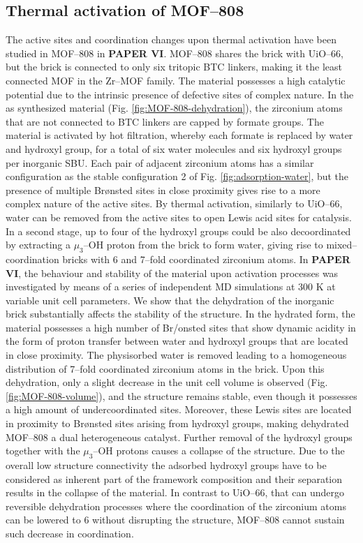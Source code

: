 \subsection{Thermal activation of MOF--808}
The active sites and coordination changes upon thermal activation have been studied in MOF--808 in \textbf{PAPER VI}. MOF--808 shares the  brick with UiO--66, but the brick is connected to only six tritopic BTC linkers, making it the least connected MOF in the Zr--MOF family. The material possesses a high catalytic potential due to the intrinsic presence of defective sites of complex nature.  In the as synthesized material (Fig. \ref{fig:MOF-808-dehydration}), the zirconium atoms that are not connected to BTC linkers are capped by formate groups. The material is activated by hot filtration, whereby each formate is replaced by water and hydroxyl group, for a total of six water molecules and six hydroxyl groups per inorganic SBU. Each pair of adjacent zirconium atoms has a similar configuration as the stable configuration 2 of Fig. \ref{fig:adsorption-water}, but the presence of multiple Br\o{}nsted sites in close proximity gives rise to a more complex nature of the active sites. By thermal activation, similarly to UiO--66, water can be removed from the active sites to open Lewis acid sites for catalysis. In a second stage, up to four of the hydroxyl groups could be also decoordinated by extracting a $\mu_3$--OH proton from the brick to form water, giving rise to mixed--coordination bricks with 6 and 7--fold coordinated zirconium atoms.
\npar
In \textbf{PAPER VI}, the behaviour and stability of the material upon activation processes was investigated by means of a series of independent MD simulations at 300 K at variable unit cell parameters. We show that the dehydration of the inorganic brick substantially affects the stability of the structure. In the hydrated form, the material possesses a high number of Br/o{}nsted sites that show dynamic acidity in the form of proton transfer between water and hydroxyl groups that are located in close proximity. The physisorbed water is removed leading to a homogeneous distribution of 7--fold coordinated zirconium atoms in the brick. Upon this dehydration, only a slight decrease in the unit cell volume is observed (Fig. \ref{fig:MOF-808-volume}), and the structure remains stable, even though it possesses a high amount of undercoordinated sites. Moreover, these Lewis sites are located in proximity to Br\o{}nsted sites arising from hydroxyl groups, making dehydrated MOF--808 a dual heterogeneous catalyst. Further removal of the hydroxyl groups together with the $\mu_3$--OH protons causes a collapse of the structure. Due to the overall low structure connectivity the adsorbed hydroxyl groups have to be considered as inherent part of the framework composition and their separation results in the collapse of the material. In contrast to UiO--66, that can undergo reversible dehydration processes where the coordination of the zirconium atoms can be lowered to 6 without disrupting the structure, MOF--808 cannot sustain such decrease in coordination.

